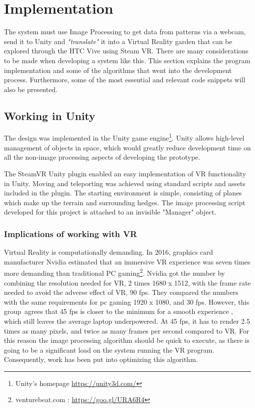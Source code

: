 \chapter{Implementation}
	The system must use Image Processing to get data from patterns via a webcam, send it to Unity and \textit{"translate"} it into a Virtual Reality garden that can be explored through the HTC Vive using Steam VR. There are many considerations to be made when developing a system like this. This section explains the program implementation and some of the algorithms that went into the development process. Furthermore, some of the most essential and relevant code snippets will also be presented.
	
	\section{Working in Unity}
The design was implemented in the Unity game engine\footnote{Unity's homepage \url{https://unity3d.com/}}. Unity allows high-level management of objects in space, which would greatly reduce development time on all the non-image processing aspects of developing the prototype.

The SteamVR Unity plugin enabled an easy implementation of VR functionality in Unity. Moving and teleporting was achieved using standard scripts and assets included in the plugin. 	
The starting environment is simple, consisting of planes which make up the terrain and surrounding hedges. The image processing script developed for this project is attached to an invisible "Manager" object.
	\subsection{Implications of working with VR}

	Virtual Reality is computationally demanding. In 2016, graphics card manufacturer Nvidia estimated that an immersive VR experience was seven times more demanding than traditional PC gaming\footnote{venturebeat.com : \url{https://goo.gl/URA6R4}}. Nvidia got the number by combining the resolution needed for VR, 2 times 1680 x 1512, with the frame rate needed to avoid the adverse effect of VR, 90 fps. They compared the numbers with the same requirements for pc gaming 1920 x 1080, and 30 fps. However, this group agrees that 45 fps is closer to the minimum for a smooth experience , which still leaves the average laptop  underpowered. At 45 fps, it has to render 2.5 times as many pixels, and twice as many frames per second compared to VR.
	For this reason the image processing algorithm should be quick to execute, as there is going to be a significant load on the system running the VR program. Consequently, work has been put into optimizing this algorithm.
